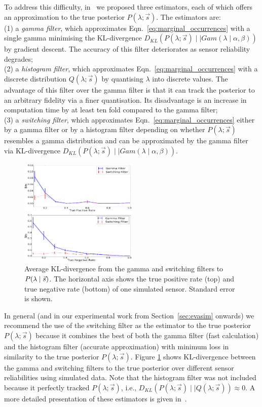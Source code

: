 To address this difficulty, in~\cite{jovan18a} we proposed three estimators, each of which offers an approximation to the true posterior $P(\lambda ; \vec{s})$. The estimators are: \\
(1) a \textit{gamma filter}, which approximates Eqn.~\ref{eq:marginal_occurrences} with a single gamma minimising the KL-divergence $D_{KL}(P(\lambda ; \vec{s}) \mid \mid Gam(\lambda \mid \alpha, \beta))$ by gradient descent. The accuracy of this filter deteriorates as sensor reliability degrades; \\
(2) a \textit{histogram filter}, which approximates Eqn.~\ref{eq:marginal_occurrences} with a discrete distribution $Q(\lambda ; \vec{s})$ by quantising $\lambda$ into discrete values. The advantage of this filter over the gamma filter is that it can track the posterior to an arbitrary fidelity via a finer quantisation. Its disadvantage is an increase in computation time by at least ten fold compared to the gamma filter; \\
(3) a \textit{switching filter}, which approximates Eqn.~\ref{eq:marginal_occurrences} either by a gamma filter or by a histogram filter depending on whether $P(\lambda ; \vec{s})$  resembles a gamma distribution and can be approximated by the gamma filter via KL-divergence $D_{KL}(P(\lambda ; \vec{s}) \mid \mid Gam(\lambda \mid \alpha, \beta))$.

\begin{figure}[t!]
	\centering
	\includegraphics[width=0.5\textwidth]{./figures/kl_div_tpr_tnr_var.png}
	\caption{Average KL-divergence from the gamma and switching filters to $P(\lambda \mid \protect\vec{s})$. The horizontal axis shows the true positive rate (top) and true negative rate (bottom) of one simulated sensor. Standard error is shown.} 
	\label{fig:kl_div_tpr_tnr_var}
\end{figure}

In general (and in our experimental work from Section~\ref{sec:evasim} onwards) we recommend the use of the switching filter as the estimator to the true posterior $P(\lambda ; \vec{s})$ because it combines the best of both the gamma filter (fast calculation) and the histogram filter (accurate approximation) with minimum loss in similarity to the true posterior $P(\lambda ; \vec{s})$. Figure \ref{fig:kl_div_tpr_tnr_var} shows KL-divergence between the gamma and switching filters to the true posterior over different sensor reliabilities using simulated data. Note that the histogram filter was not included because it perfectly tracked $P(\lambda ; \vec{s})$, i.e., $D_{KL}(P(\lambda ; \vec{s}) \mid \mid Q(\lambda ; \vec{s})) \approx 0$. A more detailed presentation of these estimators is given in~\cite{jovan18a}.